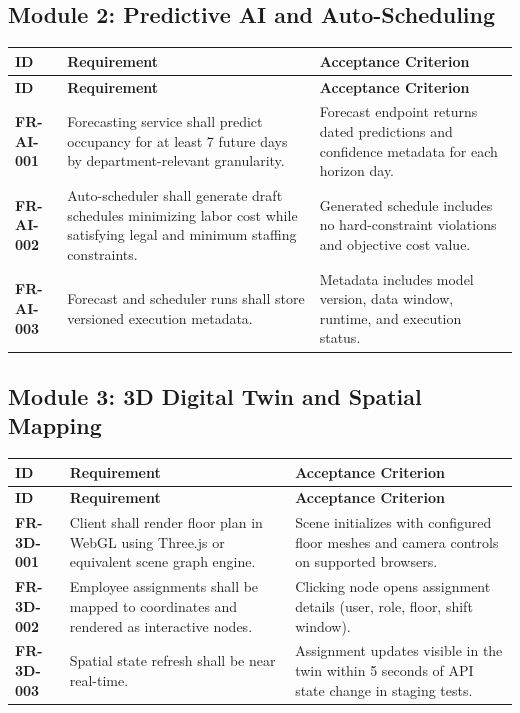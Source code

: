 \documentclass[11pt,a4paper]{article}
\newcommand{\req}[1]{\textbf{\textcolor{Primary}{#1}}}
\newcommand{\thead}[1]{\textcolor{HeaderText}{\textbf{#1}}}
\begin{document}
\subsection{Module 2: Predictive AI and Auto-Scheduling}
\begin{longtable}{P{0.13\textwidth}P{0.47\textwidth}P{0.28\textwidth}}
\toprule
{}
\thead{ID} & \thead{Requirement} & \thead{Acceptance Criterion} \\
\midrule
\endfirsthead
\toprule
{}
\thead{ID} & \thead{Requirement} & \thead{Acceptance Criterion} \\
\midrule
\endhead
\req{FR-AI-001} & Forecasting service shall predict occupancy for at least 7 future days by department-relevant granularity. & Forecast endpoint returns dated predictions and confidence metadata for each horizon day. \\
\req{FR-AI-002} & Auto-scheduler shall generate draft schedules minimizing labor cost while satisfying legal and minimum staffing constraints. & Generated schedule includes no hard-constraint violations and objective cost value. \\
\req{FR-AI-003} & Forecast and scheduler runs shall store versioned execution metadata. & Metadata includes model version, data window, runtime, and execution status. \\
\bottomrule
\end{longtable}

\subsection{Module 3: 3D Digital Twin and Spatial Mapping}
\begin{longtable}{P{0.13\textwidth}P{0.47\textwidth}P{0.28\textwidth}}
\toprule
{}
\thead{ID} & \thead{Requirement} & \thead{Acceptance Criterion} \\
\midrule
\endfirsthead
\toprule
{}
\thead{ID} & \thead{Requirement} & \thead{Acceptance Criterion} \\
\midrule
\endhead
\req{FR-3D-001} & Client shall render floor plan in WebGL using Three.js or equivalent scene graph engine. & Scene initializes with configured floor meshes and camera controls on supported browsers. \\
\req{FR-3D-002} & Employee assignments shall be mapped to coordinates and rendered as interactive nodes. & Clicking node opens assignment details (user, role, floor, shift window). \\
\req{FR-3D-003} & Spatial state refresh shall be near real-time. & Assignment updates visible in the twin within 5 seconds of API state change in staging tests. \\
\bottomrule
\end{longtable}
\end{document}
